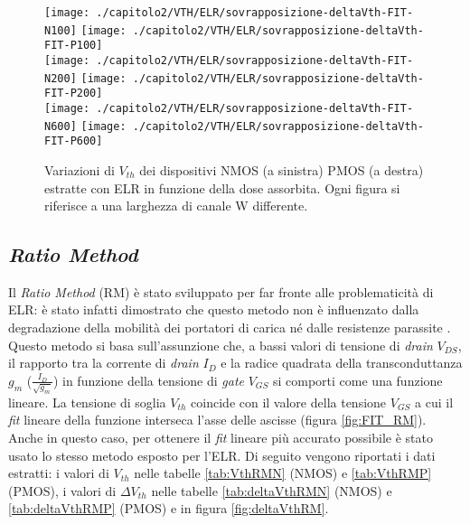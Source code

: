 \clearpage

\begin{figure}[ht]
  \centering
  \texttt{[image: ./capitolo2/VTH/ELR/sovrapposizione-deltaVth-FIT-N100]}
  \texttt{[image: ./capitolo2/VTH/ELR/sovrapposizione-deltaVth-FIT-P100]}\\
  \vspace{0.2cm}
  \texttt{[image: ./capitolo2/VTH/ELR/sovrapposizione-deltaVth-FIT-N200]}
  \texttt{[image: ./capitolo2/VTH/ELR/sovrapposizione-deltaVth-FIT-P200]}\\
  \vspace{0.2cm}
  \texttt{[image: ./capitolo2/VTH/ELR/sovrapposizione-deltaVth-FIT-N600]}
  \texttt{[image: ./capitolo2/VTH/ELR/sovrapposizione-deltaVth-FIT-P600]}
  \caption[Dati $\Delta V_{th}$ estratti con ELR]{Variazioni di $V_{th}$ dei dispositivi NMOS (a sinistra) PMOS (a destra) estratte con ELR in funzione della dose assorbita. Ogni figura si riferisce a una larghezza di canale W differente.}
  \label{fig:deltaVthELR}
\end{figure}

\FloatBarrier

\subsection[RM]{\emph{Ratio Method}}
Il \emph{Ratio Method} (RM) è stato sviluppato per far fronte alle problematicità di ELR: è stato infatti dimostrato che questo metodo non è influenzato dalla degradazione della mobilità dei portatori di carica né dalle resistenze parassite \cite{art2}. Questo metodo si basa sull'assunzione che, a bassi valori di tensione di \emph{drain} $V_{DS}$, il rapporto tra la corrente di \emph{drain} $I_D$ e la radice quadrata della transconduttanza $g_m$ ($\frac{I_D}{\sqrt{g_m}}$) in funzione della tensione di \emph{gate} $V_{GS}$ si comporti come una funzione lineare. La tensione di soglia $V_{th}$ coincide con il valore della tensione $V_{GS}$ a cui il \emph{fit} lineare della funzione interseca l'asse delle ascisse (figura \ref{fig:FIT_RM}).\\
Anche in questo caso, per ottenere il \emph{fit} lineare più accurato possibile è stato usato lo stesso metodo esposto per l'ELR.
Di seguito vengono riportati i dati estratti: i valori di ${V_{th}}$ nelle tabelle \ref{tab:VthRMN} (NMOS) e \ref{tab:VthRMP} (PMOS), i valori di $\Delta V_{th}$ nelle tabelle \ref{tab:deltaVthRMN} (NMOS) e \ref{tab:deltaVthRMP} (PMOS) e in figura \ref{fig:deltaVthRM}.  

